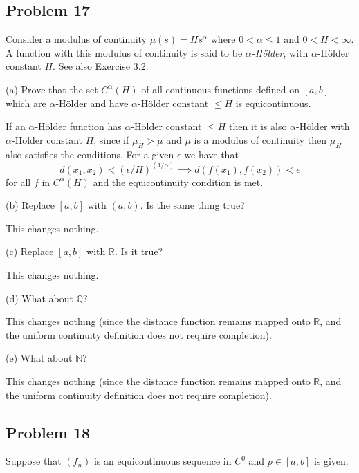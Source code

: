 \documentclass{amsart}
\begin{document}
\newpage

\subsection*{Problem 17} Consider a modulus of continuity \( \mu(s) = H s^{\alpha} \) where \( 0 < \alpha \leq 1 \) and \( 0 < H < \infty \). A function with this modulus of continuity is said to be \textit{\( \alpha \)-Hölder}, with \( \alpha \)-Hölder constant \( H \). See also Exercise 3.2.
    
(a) Prove that the set \( C^{\alpha}(H) \) of all continuous functions defined on \( [a, b] \) which are \( \alpha \)-Hölder and have \( \alpha \)-Hölder constant \( \leq H \) is equicontinuous.

\medskip \noindent If an $\alpha$-H\"{o}lder function has $\alpha$-H\"{o}lder constant $\leq H$ then it is also $\alpha$-H\"{o}lder with
$\alpha$-H\"{o}lder constant $H$, since if $\mu_H>\mu$ and $\mu$ is a modulus of continuity then $\mu_H$ also satisfies the conditions.
For a given $\epsilon$ we have that \[d(x_1, x_2)<(\epsilon/H)^{(1/\alpha)}\implies d(f(x_1), f(x_2))<\epsilon\] for all $f$ in $C^{\alpha}(H)$
and the equicontinuity condition is met.

(b) Replace \( [a, b] \) with \( (a, b) \). Is the same thing true?

\medskip \noindent This changes nothing.

\bigskip

(c) Replace \( [a, b] \) with \( \mathbb{R} \). Is it true?

\medskip \noindent This changes nothing.

\bigskip

(d) What about \( \mathbb{Q}? \)

\medskip \noindent This changes nothing (since the distance function remains mapped onto $\mathbb{R}$, and the uniform continuity definition does not require completion).

\bigskip

(e) What about \( \mathbb{N}? \)
    
\medskip \noindent This changes nothing (since the distance function remains mapped onto $\mathbb{R}$, and the uniform continuity definition does not require completion).

\newpage

\subsection*{Problem 18} Suppose that \( (f_n) \) is an equicontinuous sequence in \( C^0 \) and \( p \in [a, b] \) is given.
    
\end{document}
